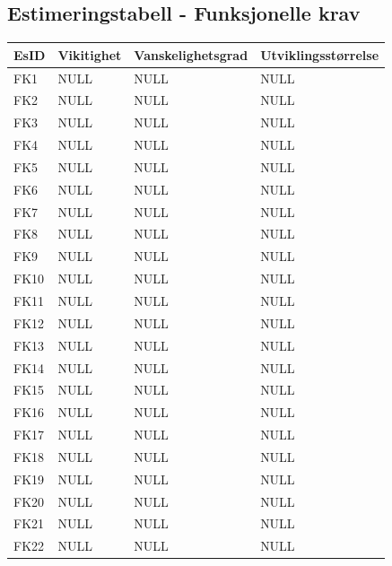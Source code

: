 \documentclass[12pt]{article}
\begin{document}
    \subsection{Estimeringstabell - Funksjonelle krav}
        \begin{tabular}{|p{2cm}|p{4cm}|p{4cm}|p{4cm}| } 
            \hline
            \bf EsID & \bf Vikitighet & \bf Vanskelighetsgrad & \bf Utviklingsstørrelse\\
            \hline
            FK1 & NULL & NULL & NULL\\
            \hline
            FK2 & NULL & NULL & NULL\\
            \hline
            FK3 & NULL & NULL & NULL\\
            \hline
            FK4 & NULL & NULL & NULL\\
            \hline
            FK5 & NULL & NULL & NULL\\
            \hline
            FK6 & NULL & NULL & NULL\\
            \hline
            FK7 & NULL & NULL & NULL\\
            \hline
            FK8 & NULL & NULL & NULL\\
            \hline
            FK9 & NULL & NULL & NULL\\
            \hline
            FK10 & NULL & NULL & NULL\\
            \hline
            FK11 & NULL & NULL & NULL\\
            \hline
            FK12 & NULL & NULL & NULL\\
            \hline
            FK13 & NULL & NULL & NULL\\
            \hline
            FK14 & NULL & NULL & NULL\\
            \hline
            FK15 & NULL & NULL & NULL\\
            \hline
            FK16 & NULL & NULL & NULL\\
            \hline
            FK17 & NULL & NULL & NULL\\
            \hline
            FK18 & NULL & NULL & NULL\\
            \hline
            FK19 & NULL & NULL & NULL\\
            \hline
            FK20 & NULL & NULL & NULL\\
            \hline
            FK21 & NULL & NULL & NULL\\
            \hline
            FK22 & NULL & NULL & NULL\\

\end{tabular}
\end{document}
